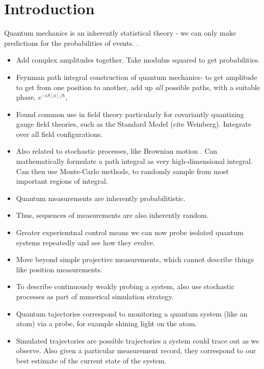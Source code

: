 \chapter{Introduction}



Quantum mechanics is an inherently statistical theory - we can only make predictions for the probabilities of events.  
.
\begin{itemize}
\item Add complex amplitudes together.  Take modulus squared to get probabilities.  
\item Feynman path integral construction of quantum mechanics- to get amplitude to get from one position to another, add up \emph{all} possible paths, with a suitable phase, $e^{-i S[x]/\hbar}$, \cite{Feynman1942, Feynman1965}
\item Found common use in field theory particularly for covariantly quantizing gauge field theories, such as the Standard Model (cite Weinberg).  Integrate over all field configurations.  
\item  Also related to stochastic processes, like Brownian motion \cite{Karatzas1991}.   Can mathematically formulate a path integral as very high-dimensional integral.  Can then use Monte-Carlo methods, to randomly sample from most important regions of integral.  
\end{itemize}

\begin{itemize}
\item Quantum measurements are inherently probabilitistic.  
\item Thus, sequences of measurements are also inherently random.  
\item Greater experiemtnal control means we can now probe isolated quantum systems repeatedly and see how they evolve.  
\item Move beyond simple projective measurements, which cannot describe things like position measurements.
\item To describe continuously weakly probing a system, also use stochastic processes as part of numerical simulation strategy.
\item Quantum tajectories correspond to monitoring a quantum system (like an atom) via a probe, for example shining light on the atom. \cite{Carmichael1993}
\item Simulated trajectories are possible trajectories a system could trace out as we observe.  Also given a particular measurement record, they correspond to our best estimate of the current state of the system.  
\end{itemize}

